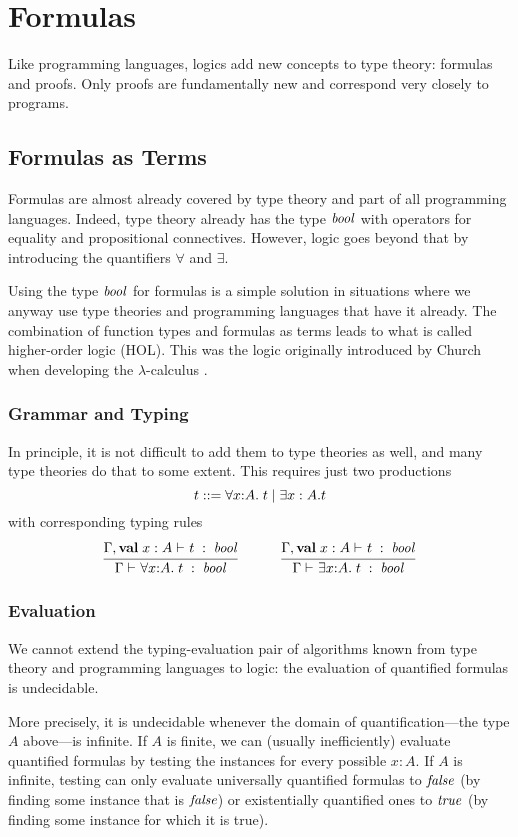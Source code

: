 \section{Formulas}

Like programming languages, logics add new concepts to type theory: formulas and proofs.
Only proofs are fundamentally new and correspond very closely to programs.

\subsection{Formulas as Terms}

Formulas are almost already covered by type theory and part of all programming languages.
Indeed, type theory already has the type $\mathit{bool}$ with operators for equality and propositional connectives.
However, logic goes beyond that by introducing the quantifiers $\forall$ and $\exists$.

Using the type $\mathit{bool}$ for formulas is a simple solution in situations where we anyway use type theories and programming languages that have it already.
The combination of function types and formulas as terms leads to what is called higher-order logic (HOL).
This was the logic originally introduced by Church when developing the $\lambda$-calculus \cite{churchtypes}.

\subsubsection{Grammar and Typing}

In principle, it is not difficult to add them to type theories as well, and many type theories do that to some extent.
This requires just two productions
\[t \bbc \afa[A]{x}{t} \bnfalt \exists x:A.t\]
with corresponding typing rules
\[\rul{\oftype{}{\Gamma,\aval{x}{A}{}}{t}{\Bool}}{\oftype{}{\Gamma}{\afa[A]{x}{t}}{\Bool}}
\tb\tb
\rul{\oftype{}{\Gamma,\aval{x}{A}{}}{t}{\Bool}}{\oftype{}{\Gamma}{\aex[A]{x}{t}}{\Bool}}
\]

\subsubsection{Evaluation}

We cannot extend the typing-evaluation pair of algorithms known from type theory and programming languages to logic: the evaluation of quantified formulas is undecidable.

More precisely, it is undecidable whenever the domain of quantification---the type $A$ above---is infinite.
If $A$ is finite, we can (usually inefficiently) evaluate quantified formulas by testing the instances for every possible $x:A$.
If $A$ is infinite, testing can only evaluate universally quantified formulas to $\mathit{false}$ (by finding some instance that is $\mathit{false}$) or existentially quantified ones to $\mathit{true}$ (by finding some instance for which it is true).

